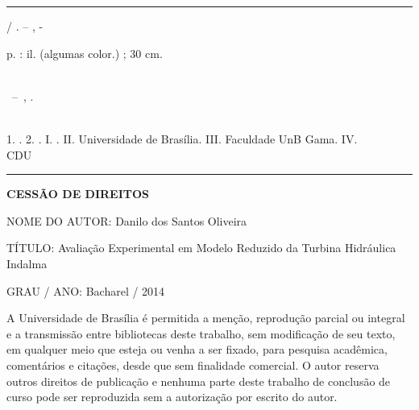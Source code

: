 




\begin{fichacatalografica}
	\vspace*{\fill}				%
	\hrule					%
	\begin{center}				%
	\begin{minipage}[c]{12.5cm}		%
	
	\imprimirautor
	
	\hspace{0.5cm} \imprimirtitulo  / \imprimirautor. --
	\imprimirlocal, \imprimirdata-
	
	\hspace{0.5cm} \pageref{LastPage} p. : il. (algumas color.) ; 30 cm.\\
	
	\hspace{0.5cm} \imprimirorientadorRotulo~\imprimirorientador\\
	
	\hspace{0.5cm}
	\parbox[t]{\textwidth}{\imprimirtipotrabalho~--~\imprimirinstituicao,
	\imprimirdata.}\\
	
	\hspace{0.5cm}
		1. \imprimirpalavrachaveum.
		2. \imprimirpalavrachavedois.
		I. \imprimirorientador.
		II. Universidade de Brasília.
		III. Faculdade UnB Gama.
		IV. \imprimirtitulo\\ 			
	
	\hspace{8.75cm} CDU \nomecdu\\
	
	\end{minipage}
	\end{center}
	\hrule
\end{fichacatalografica}

\hspace{15cm}

\textbf{CESSÃO DE DIREITOS}

\hspace{15cm}

NOME DO AUTOR: Danilo dos Santos Oliveira

TÍTULO: Avaliação Experimental em Modelo Reduzido da Turbina Hidráulica Indalma

GRAU / ANO: Bacharel / 2014



A Universidade de Brasília é permitida a menção, reprodução parcial ou integral e a transmissão entre
bibliotecas deste trabalho, sem modificação de seu texto, em qualquer meio
que esteja ou venha a ser fixado, para pesquisa acadêmica, comentários e
citações, desde que sem finalidade comercial.
O autor reserva outros direitos de publicação e nenhuma parte deste trabalho de conclusão de curso 
pode ser reproduzida sem a autorização por escrito do autor.


